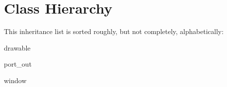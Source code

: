 \section{Class Hierarchy}
This inheritance list is sorted roughly, but not completely, alphabetically\+:\begin{DoxyCompactList}
\item drawable\begin{DoxyCompactList}
\item {}
\end{DoxyCompactList}
\item {}
\item {}
\item port\+\_\+out\begin{DoxyCompactList}
\item {}
\end{DoxyCompactList}
\item window\begin{DoxyCompactList}
\item {}
\begin{DoxyCompactList}
\item {}
\end{DoxyCompactList}
\end{DoxyCompactList}
\end{DoxyCompactList}
